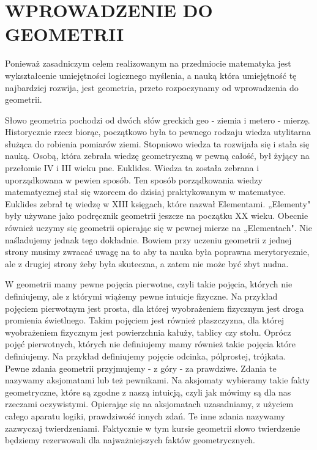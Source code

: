 \documentclass[10pt]{article}
\begin{document}
\section*{WPROWADZENIE DO GEOMETRII}
Ponieważ zasadniczym celem realizowanym na przedmiocie matematyka jest wykształcenie umiejętności logicznego myślenia, a nauką która umiejętność tę najbardziej rozwija, jest geometria, przeto rozpoczynamy od wprowadzenia do geometrii.

Słowo geometria pochodzi od dwóch słów greckich geo - ziemia i metero - mierzę. Historycznie rzecz biorąc, początkowo była to pewnego rodzaju wiedza utylitarna służąca do robienia pomiarów ziemi. Stopniowo wiedza ta rozwijała się i stała się nauką. Osobą, która zebrała wiedzę geometryczną w pewną całość, był żyjący na przełomie IV i III wieku pne. Euklides. Wiedza ta została zebrana i uporządkowana w pewien sposób. Ten sposób porządkowania wiedzy matematycznej stał się wzorcem do dzisiaj praktykowanym w matematyce. Euklides zebrał tę wiedzę w XIII księgach, które nazwał Elementami. „Elementy" były używane jako podręcznik geometrii jeszcze na początku XX wieku. Obecnie również uczymy się geometrii opierając się w pewnej mierze na „Elementach". Nie naśladujemy jednak tego dokładnie. Bowiem przy uczeniu geometrii z jednej strony musimy zwracać uwagę na to aby ta nauka była poprawna merytorycznie, ale z drugiej strony żeby była skuteczna, a zatem nie może być zbyt nudna.

W geometrii mamy pewne pojęcia pierwotne, czyli takie pojęcia, których nie definiujemy, ale z którymi wiążemy pewne intuicje fizyczne. Na przykład pojęciem pierwotnym jest prosta, dla której wyobrażeniem fizycznym jest droga promienia świetlnego. Takim pojęciem jest również płaszczyzna, dla której wyobrażeniem fizycznym jest powierzchnia kałuży, tablicy czy stołu. Oprócz pojęć pierwotnych, których nie definiujemy mamy również takie pojęcia które definiujemy. Na przykład definiujemy pojęcie odcinka, pólprostej, trójkata.\\
Pewne zdania geometrii przyjmujemy - z góry - za prawdziwe. Zdania te\\
nazywamy aksjomatami lub też pewnikami. Na aksjomaty wybieramy takie fakty geometryczne, które są zgodne z naszą intuicją, czyli jak mówimy są dla nas rzeczami oczywistymi. Opierając się na aksjomatach uzasadniamy, z użyciem całego aparatu logiki, prawdziwość innych zdań. Te inne zdania nazywamy zazwyczaj twierdzeniami. Faktycznie w tym kursie geometrii słowo twierdzenie będziemy rezerwowali dla najważniejszych faktów geometrycznych.
\end{document}
